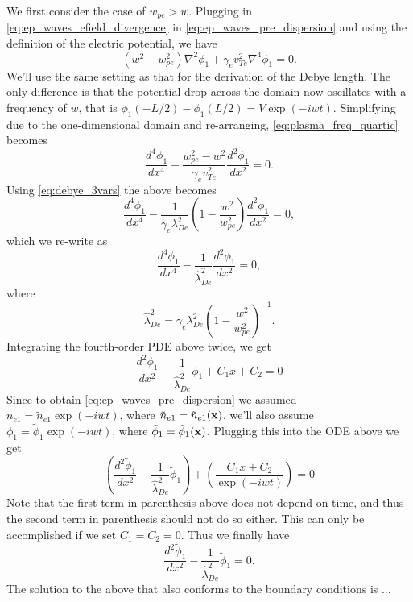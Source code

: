 \documentclass[a4paper,11pt]{report}
\begin{document}
We first consider the case of $w_{pe} > w$. Plugging in \cref{eq:ep_waves_efield_divergence} in \cref{eq:ep_waves_pre_dispersion} and using the definition of the electric potential, we have 
\begin{equation}
    \label{eq:plasma_freq_quartic}
    (w^2 - w_{pe}^2) \nabla^2 \phi_1 + \gamma_e v_{Te}^2 \nabla^4 \phi_1 = 0.
\end{equation}
We'll use the same setting as that for the derivation of the Debye length. The only difference is that the potential drop across the domain now oscillates with a frequency of $w$, that is $\phi_1(-L/2) - \phi_1(L/2) = V \exp (-iwt)$. Simplifying due to the one-dimensional domain and re-arranging, \cref{eq:plasma_freq_quartic} becomes
\begin{equation*}
     \frac{d^4 \phi_1}{dx^4} - \frac{w_{pe}^2 - w^2}{\gamma_e v_{Te}^2} \frac{d^2 \phi_1}{dx^2} = 0.
\end{equation*}
Using \cref{eq:debye_3vars} the above becomes
\begin{equation*}
    \frac{d^4 \phi_1}{dx^4} - \frac{1}{\gamma_e \lambda_{De}^2} \left ( 1 - \frac{w^2}{w_{pe}^2} \right ) \frac{d^2 \phi_1}{dx^2} = 0,
\end{equation*}
which we re-write as
\begin{equation*}
    \frac{d^4 \phi_1}{dx^4} - \frac{1}{\hat{\lambda}^2_{De}} \frac{d^2 \phi_1}{dx^2} = 0,
\end{equation*}
where 
\begin{equation*}
    \hat{\lambda}_{De}^2 = \gamma_e \lambda_{De}^2 \left ( 1 - \frac{w^2}{w_{pe}^2} \right )^{-1}.
\end{equation*}  
Integrating the fourth-order PDE above twice, we get
\begin{equation*}
    \frac{d^2 \phi_1}{dx^2} - \frac{1}{\hat{\lambda}^2_{De}} \phi_1 + C_1 x + C_2= 0
\end{equation*}
Since to obtain \cref{eq:ep_waves_pre_dispersion} we assumed $n_{e1} = \tilde{n}_{e1} \exp(-iwt)$, where $\tilde{n}_{e1} = \tilde{n}_{e1}(\mathbf{x})$, we'll also assume $\phi_1 = \tilde{\phi}_1 \exp(-iwt)$, where $\tilde{\phi}_1 = \tilde{\phi}_1(\mathbf{x})$. Plugging this into the ODE above we get
\begin{equation*}
     \left (\frac{d^2 \tilde{\phi}_1}{dx^2} - \frac{1}{\hat{\lambda}^2_{De}} \tilde{\phi}_1 \right ) + \left ( \frac{C_1 x + C_2}{\exp(-iwt)} \right )= 0
\end{equation*}
Note that the first term in parenthesis above does not depend on time, and thus the second term in parenthesis should not do so either. This can only be accomplished if we set $C_1 = C_2 = 0$. Thus we finally have
\begin{equation}
    \frac{d^2 \tilde{\phi}_1}{dx^2} - \frac{1}{\hat{\lambda}^2_{De}} \tilde{\phi}_1 = 0.
\end{equation}
The solution to the above that also conforms to the boundary conditions is ...
\end{document}
